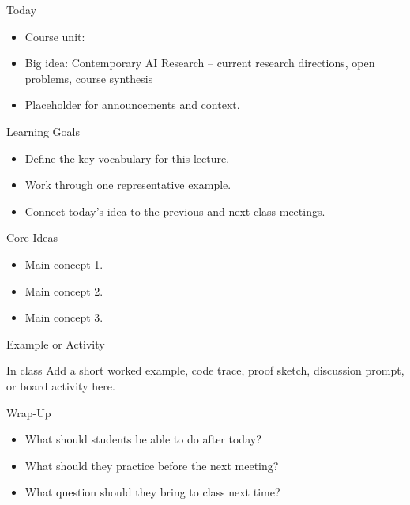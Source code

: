 \documentclass[aspectratio=169]{beamer}
\begin{document}
\makedecktitle

\begin{frame}{Today}
  \begin{itemize}
    \item Course unit: \CourseUnit
    \item Big idea: Contemporary AI Research -- current research directions, open problems, course synthesis
    \item Placeholder for announcements and context.
  \end{itemize}
\end{frame}

\begin{frame}{Learning Goals}
  \begin{itemize}
    \item Define the key vocabulary for this lecture.
    \item Work through one representative example.
    \item Connect today's idea to the previous and next class meetings.
  \end{itemize}
\end{frame}

\begin{frame}{Core Ideas}
  \placeholdernote
  \begin{itemize}
    \item Main concept 1.
    \item Main concept 2.
    \item Main concept 3.
  \end{itemize}
\end{frame}

\begin{frame}{Example or Activity}
  \begin{block}{In class}
    Add a short worked example, code trace, proof sketch, discussion prompt, or board activity here.
  \end{block}
\end{frame}

\begin{frame}{Wrap-Up}
  \begin{itemize}
    \item What should students be able to do after today?
    \item What should they practice before the next meeting?
    \item What question should they bring to class next time?
  \end{itemize}
\end{frame}
\end{document}
